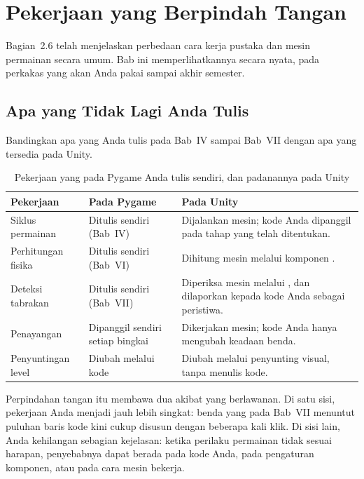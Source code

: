 \section{Pekerjaan yang Berpindah Tangan}
\label{sec:perpindahan-tangan}

Bagian~2.6 telah menjelaskan perbedaan cara kerja pustaka dan mesin permainan
secara umum. Bab ini memperlihatkannya secara nyata, pada perkakas yang akan
Anda pakai sampai akhir semester.

\subsection{Apa yang Tidak Lagi Anda Tulis}

Bandingkan apa yang Anda tulis pada Bab~IV sampai Bab~VII dengan apa yang
tersedia pada Unity.

\begin{table}[htbp]
\centering
\caption{Pekerjaan yang pada Pygame Anda tulis sendiri, dan padanannya pada Unity}
\label{tab:pekerjaan-berpindah}
{\setlength{\tabcolsep}{4pt}\footnotesize%
\begin{tabularx}{\textwidth}{@{}L{4.2cm} L{3.2cm} Y@{}}
\toprule
\headrow \textbf{Pekerjaan} & \textbf{Pada Pygame} & \textbf{Pada Unity} \\
\midrule
Siklus permainan & Ditulis sendiri (Bab~IV) &
Dijalankan mesin; kode Anda dipanggil pada tahap yang telah ditentukan. \\
\addlinespace
Perhitungan fisika & Ditulis sendiri (Bab~VI) &
Dihitung mesin melalui komponen . \\
\addlinespace
Deteksi tabrakan & Ditulis sendiri (Bab~VII) &
Diperiksa mesin melalui , dan dilaporkan kepada kode Anda
sebagai peristiwa. \\
\addlinespace
Penayangan & Dipanggil sendiri setiap bingkai &
Dikerjakan mesin; kode Anda hanya mengubah keadaan benda. \\
\addlinespace
Penyuntingan level & Diubah melalui kode &
Diubah melalui penyunting visual, tanpa menulis kode. \\
\bottomrule
\end{tabularx}}
\end{table}

Perpindahan tangan itu membawa dua akibat yang berlawanan. Di satu sisi,
pekerjaan Anda menjadi jauh lebih singkat: benda yang pada Bab~VII menuntut
puluhan baris kode kini cukup disusun dengan beberapa kali klik. Di sisi lain,
Anda kehilangan sebagian kejelasan: ketika perilaku permainan tidak sesuai
harapan, penyebabnya dapat berada pada kode Anda, pada pengaturan komponen,
atau pada cara mesin bekerja.

